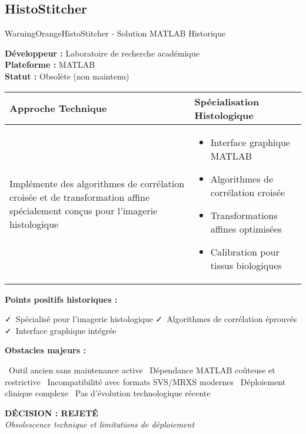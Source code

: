 \documentclass[11pt,a4paper]{article}
\newcommand{\pro}[1]{\textcolor{SuccessGreen}{\faCheck\ #1}}
\newcommand{\con}[1]{\textcolor{DangerRed}{\faTimes\ #1}}
\begin{document}
\subsection{HistoStitcher}

\begin{techbox}{WarningOrange}{HistoStitcher - Solution MATLAB Historique}

\textbf{Développeur :} Laboratoire de recherche académique \\
\textbf{Plateforme :} MATLAB \\
\textbf{Statut :} Obsolète (non maintenu)

\vspace{0.5cm}

\begin{tabularx}{\textwidth}{|X|X|}
\hline
\rowcolor{LightGray}
\textbf{Approche Technique} & \textbf{Spécialisation Histologique} \\
\hline
Implémente des algorithmes de corrélation croisée et de transformation affine spécialement conçus pour l'imagerie histologique &
\begin{itemize}[nosep]
\item Interface graphique MATLAB
\item Algorithmes de corrélation croisée
\item Transformations affines optimisées
\item Calibration pour tissus biologiques
\end{itemize} \\
\hline
\end{tabularx}

\vspace{0.5cm}

\textbf{Points positifs historiques :}
\begin{itemize}[leftmargin=*]
    \pro{Spécialisé pour l'imagerie histologique}
    \pro{Algorithmes de corrélation éprouvés}
    \pro{Interface graphique intégrée}
\end{itemize}

\textbf{Obstacles majeurs :}
\begin{itemize}[leftmargin=*]
    \con{Outil ancien sans maintenance active}
    \con{Dépendance MATLAB coûteuse et restrictive}
    \con{Incompatibilité avec formats SVS/MRXS modernes}
    \con{Déploiement clinique complexe}
    \con{Pas d'évolution technologique récente}
\end{itemize}

\begin{center}
\textbf{\textcolor{DangerRed}{DÉCISION : REJETÉ}}\\
\textit{Obsolescence technique et limitations de déploiement}
\end{center}

\end{techbox}
\end{document}
